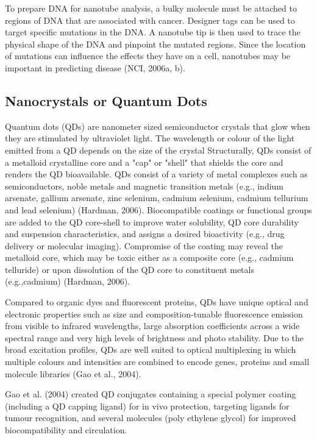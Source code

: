 \documentclass{article}
\begin{document}
\begin{multicols}
To prepare DNA for nanotube analysis, a bulky molecule must be attached
to regions of DNA that are associated with
cancer. Designer tags can be used to target
specific mutations in the DNA. A nanotube
tip is then used to trace the physical shape
of the DNA and pinpoint the mutated regions. Since the location of mutations can
influence the effects they have on a cell, nanotubes may be important in predicting disease (NCI, 2006a, b).

\subsection{Nanocrystals or Quantum Dots}Quantum dots (QDs) are nanometer sized semiconductor crystals that glow when they are stimulated by ultraviolet light. The wavelength or colour of the light emitted from a QD depends on the size of the crystal
Structurally, QDs consist of a metalloid crystalline core and a "cap" or "shell" that shields the core and renders the QD bioavailable. QDs consist of a variety of metal complexes such as semiconductors, noble metals and magnetic transition metals (e.g., indium arsenate, gallium arsenate, zinc selenium, cadmium selenium, cadmium tellurium and lead selenium) (Hardman, 2006). Biocompatible coatings or functional groups are added to the QD core-shell to improve water solubility, QD core durability and suspension characteristics, and assigns a desired bioactivity (e.g., drug delivery or molecular imaging). Compromise of the coating may reveal the metalloid core, which may be toxic either as a composite core (e.g., cadmium telluride) or upon dissolution of the QD core to constituent metals (e.g.,cadmium) (Hardman, 2006). 

Compared to organic dyes and fluorescent proteins, QDs have unique optical and electronic properties such as size and composition-tunable fluorescence emission from visible to infrared wavelengths,  large absorption coefficients across a wide spectral range and very high levels of brightness and photo stability. Due to the broad excitation profiles, QDs are well suited to optical multiplexing in which multiple colours and intensities are combined to encode genes, proteins and small molecule libraries (Gao et al., 2004).

Gao et al. (2004) created QD conjugates containing a special polymer coating (including a QD capping ligand) for in vivo protection, targeting ligands for tumour recognition, and several molecules (poly ethylene glycol) for improved biocompatibility and circulation. 


\end{multicols}

\printbibliography
\end{document}
